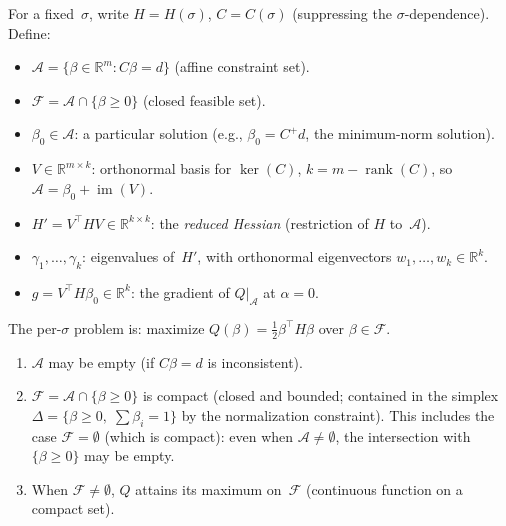 \begin{remark}\label{rem:qp-setup}
For a fixed~$\sigma$, write $H = H(\sigma)$,
$C = C(\sigma)$ (suppressing the $\sigma$-dependence).
Define:
\begin{itemize}
  \item $\mathcal{A} = \{\beta \in \mathbb{R}^m : C\beta = d\}$
    \quad (affine constraint set).
  \item $\mathcal{F} = \mathcal{A} \cap \{\beta \geq 0\}$
    \quad (closed feasible set).
  \item $\beta_0 \in \mathcal{A}$: a particular solution
    (e.g., $\beta_0 = C^+ d$, the minimum-norm solution).
  \item $V \in \mathbb{R}^{m \times k}$: orthonormal basis for
    $\ker(C)$,\; $k = m - \operatorname{rank}(C)$,
    \;so $\mathcal{A} = \beta_0 + \operatorname{im}(V)$.
  \item $H' = V^\top H V \in \mathbb{R}^{k \times k}$:
    the \emph{reduced Hessian} (restriction of $H$ to~$\mathcal{A}$).
  \item $\gamma_1, \ldots, \gamma_k$: eigenvalues of~$H'$,
    with orthonormal eigenvectors $w_1, \ldots, w_k \in \mathbb{R}^k$.
  \item $g = V^\top H \beta_0 \in \mathbb{R}^k$:
    the gradient of $Q|_{\mathcal{A}}$ at $\alpha = 0$.
\end{itemize}
The per-$\sigma$ problem is:
maximize $Q(\beta) = \tfrac{1}{2}\beta^\top H \beta$
over $\beta \in \mathcal{F}$.
\end{remark}

\begin{proposition}%
\label{prop:basic-properties}
\leavevmode
\begin{enumerate}
  \item $\mathcal{A}$ may be empty (if $C\beta = d$ is inconsistent).
  \item $\mathcal{F} = \mathcal{A} \cap \{\beta \geq 0\}$
    is compact (closed and bounded; contained in the simplex
    $\Delta = \{\beta \geq 0,\; \sum \beta_i = 1\}$
    by the normalization constraint).
    This includes the case $\mathcal{F} = \emptyset$
    (which is compact): even when $\mathcal{A} \neq \emptyset$,
    the intersection with $\{\beta \geq 0\}$ may be empty.
  \item When $\mathcal{F} \neq \emptyset$,
    $Q$ attains its maximum on~$\mathcal{F}$
    (continuous function on a compact set).
\end{enumerate}
\end{proposition}

